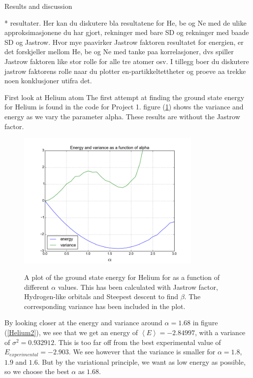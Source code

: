 \documentclass[a4paper, 12pt, titlepage]{article}
\begin{document}
\begin{section}{Results and discussion}

* resultater. Her kan du diskutere bla resultatene for He, be og Ne med de ulike approksimasjonene du har gjort, rekninger med bare SD og rekninger med baade SD og Jastrow. Hvor mye paavirker Jastrow faktoren resultatet for energien, er det forskjeller mellom He, be og Ne med tanke paa korrelasjoner, dvs spiller Jastrow faktoren like stor rolle for alle tre atomer osv. I tillegg boer du diskutere jastrow faktorens rolle naar du plotter en-partikkeltettheter og proeve aa trekke noen konklusjoner utifra det.


 \begin{subsection}{First look at Helium atom}
 	The first attempt at finding the ground state energy for Helium is found in the code for Project 1. figure (\ref{Helium1}) shows the variance and energy as we vary the parameter alpha. These results are without the Jastrow factor. 

 \begin{figure}[H]
 	\centering
 	\includegraphics[width=0.8\textwidth]{../python_programs/EnergyVariance_helium1.png}
 	\label{Helium1}
 	\caption{A plot of the ground state energy for Helium for as a function of different $\alpha$ values. This has been calculated with Jastrow factor, Hydrogen-like orbitals and Steepest descent to find $\beta$. The corresponding variance has been included in the plot. }
 \end{figure}

 By looking closer at the energy and variance around $\alpha = 1.68$ in figure (\ref{Helium2}), we see that we get an energy of $\left<E\right> = -2.84997$, with a variance of $\sigma ^2 = 0.932912$. This is too far off from the best experimental value of $E_{experimental} = -2.903$. We see however that the variance is smaller for $\alpha = 1.8$, $1.9$ and $1.6$. But by the variational principle, we want as low energy as possible, so we choose the best $\alpha$ as $1.68$. 
 

\end{subsection}
\end{section}
\end{document}
